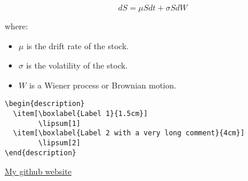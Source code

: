 \documentclass[../main.tex]{subfiles}
\begin{document}
\begin{equation}
    dS = \mu S dt + \sigma S dW
\end{equation}

where:
\begin{itemize}
    \item \( \mu \) is the drift rate of the stock.
    \item \( \sigma \) is the volatility of the stock.
    \item \( W \) is a Wiener process or Brownian motion.
\end{itemize}


\begin{verbatim}
\begin{description}
  \item[\boxlabel{Label 1}{1.5cm}]
        \lipsum[1]
  \item[\boxlabel{Label 2 with a very long comment}{4cm}]
        \lipsum[2]
\end{description}
\end{verbatim}
\href{https://github.com/eraser83k}{My github website}


\end{document}
